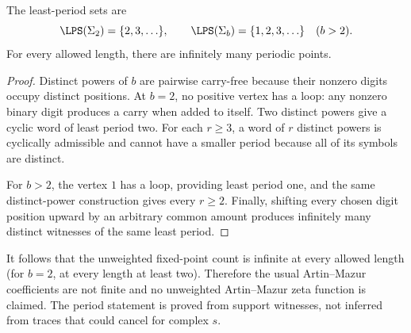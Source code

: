 \begin{proposition}
\label{prop:least-periods}
The least-period sets are
\begin{equation}
  \LPS(\Sigma_2)=\{2,3,\ldots\},
  \qquad
  \LPS(\Sigma_b)=\{1,2,3,\ldots\}\quad(b>2).
  \label{eq:least-period-sets}
\end{equation}
For every allowed length, there are infinitely many periodic points.
\end{proposition}

\begin{proof}
Distinct powers of \(b\) are pairwise carry-free because their nonzero
digits occupy distinct positions.  At \(b=2\), no positive vertex has a
loop: any nonzero binary digit produces a carry when added to itself.
Two distinct powers give a cyclic word of least period two.  For each
\(r\ge3\), a word of \(r\) distinct powers is cyclically admissible and
cannot have a smaller period because all of its symbols are distinct.

For \(b>2\), the vertex \(1\) has a loop, providing least period one, and
the same distinct-power construction gives every \(r\ge2\).  Finally,
shifting every chosen digit position upward by an arbitrary common amount
produces infinitely many distinct witnesses of the same least period.
\end{proof}

It follows that the unweighted fixed-point count is infinite at every
allowed length (for \(b=2\), at every length at least two).  Therefore the
usual Artin--Mazur coefficients are not finite and no unweighted
Artin--Mazur zeta function is claimed.  The period statement is proved from
support witnesses, not inferred from traces that could cancel for complex
\(s\).
